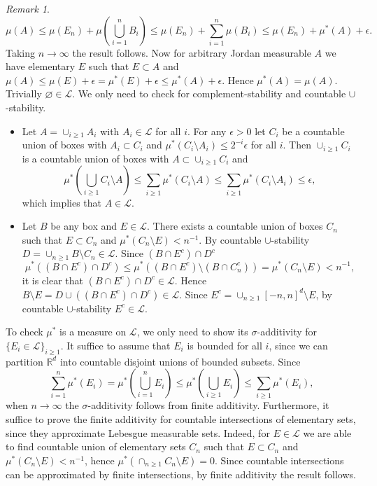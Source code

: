 \documentclass[hidelinks,11pt]{article}
\theoremstyle{definition}
\theoremstyle{dotless}
\theoremstyle{remark}
\newtheorem*{remark}{Remark}
\DeclareMathOperator{\1}{\mathbf{1}}
\begin{document}
\begin{remark}
\[\mu(A)\leq\mu(E_n)+\mu(\bigcup_{i=1}^nB_i)\leq\mu(E_n)+\sum_{i=1}^n\mu(B_i)\leq\mu(E_n)+\mu^\ast(A)+\epsilon.\]
Taking $n\to\infty$ the result follows. Now for arbitrary Jordan measurable $A$ we have elementary $E$ such that $E\subset A$ and $\mu(A)\leq\mu(E)+\epsilon=\mu^\ast(E)+\epsilon\leq\mu^\ast(A)+\epsilon$. Hence $\mu^\ast(A)=\mu(A)$.\medbreak
Trivially $\varnothing\in\mathcal{L}$. We only need to check for complement-stability and countable $\cup$-stability.\begin{itemize}
    \item Let $A=\cup_{i\geq1}A_i$ with $A_i\in\mathcal{L}$ for all $i$. For any $\epsilon>0$ let $C_i$ be a countable union of boxes with $A_i\subset C_i$ and $\mu^\ast(C_i\setminus A_i)\leq2^{-i}\epsilon$ for all $i$. Then $\cup_{i\geq1}C_i$ is a countable union of boxes with $A\subset\cup_{i\geq1}C_i$ and
    \[\mu^\ast(\bigcup_{i\geq1}C_i\setminus A)\leq\sum_{i\geq1}\mu^\ast(C_i\setminus A)\leq\sum_{i\geq1}\mu^\ast(C_i\setminus A_i)\leq\epsilon,\]
    which implies that $A\in\mathcal{L}$.
    \item Let $B$ be any box and $E\in\mathcal{L}$. There exists a countable union of boxes $C_n$ such that $E\subset C_n$ and $\mu^\ast(C_n\setminus E)<n^{-1}$. By countable $\cup$-stability $D=\cup_{n\geq1}B\setminus C_n\in\mathcal{L}$. Since $(B\cap E^c)\cap D^c$
    \[\mu^\ast((B\cap E^c)\cap D^c)\leq\mu^\ast((B\cap E^c)\setminus(B\cap C_n^c))=\mu^\ast(C_n\setminus E)<n^{-1},\]
    it is clear that $(B\cap E^c)\cap D^c\in\mathcal{L}$. Hence $B\setminus E=D\cup((B\cap E^c)\cap D^c)\in\mathcal{L}$. Since $E^c=\cup_{n\geq1}[-n,n]^d\setminus E$, by countable $\cup$-stability $E^c\in\mathcal{L}$.
\end{itemize}
To check $\mu^\ast$ is a measure on $\mathcal{L}$, we only need to show its $\sigma$-additivity for $\{E_i\in\mathcal{L}\}_{i\geq1}$. It suffice to assume that $E_i$ is bounded for all $i$, since we can partition $\mathbb{R}^d$ into countable disjoint unions of bounded subsets. Since
\[\sum_{i=1}^n\mu^\ast(E_i)=\mu^\ast(\bigcup_{i=1}^nE_i)\leq\mu^\ast(\bigcup_{i\geq1}E_i)\leq\sum_{i\geq1}\mu^\ast(E_i),\]
when $n\to\infty$ the $\sigma$-additivity follows from finite additivity. Furthermore, it suffice to prove the finite additivity for countable intersections of elementary sets, since they approximate Lebesgue measurable sets. Indeed, for $E\in\mathcal{L}$ we are able to find countable union of elementary sets $C_n$ such that $E\subset C_n$ and $\mu^\ast(C_n\setminus E)<n^{-1}$, hence $\mu^\ast(\cap_{n\geq1}C_n\setminus E)=0$. Since countable intersections can be approximated by finite intersections, by finite additivity the result follows.
\end{remark}
\end{document}
